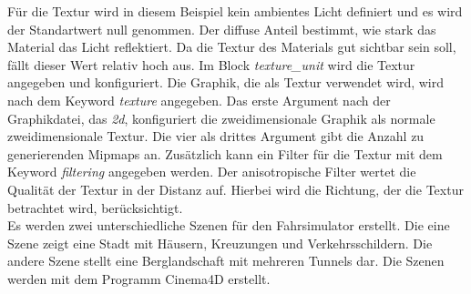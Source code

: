 Für die Textur wird in diesem Beispiel kein ambientes Licht definiert und es wird der Standartwert null genommen. Der diffuse Anteil bestimmt, wie stark das Material das Licht reflektiert. Da die Textur des Materials gut sichtbar sein soll, fällt dieser Wert relativ hoch aus. Im Block \textit{texture\_unit} wird die Textur angegeben und konfiguriert. Die Graphik, die als Textur verwendet wird, wird nach dem Keyword \textit{texture} angegeben. Das erste Argument nach der Graphikdatei, das \textit{2d}, konfiguriert die zweidimensionale Graphik als normale zweidimensionale Textur. Die vier als drittes Argument gibt die Anzahl zu generierenden Mipmaps an. Zusätzlich kann ein Filter für die Textur mit dem Keyword \textit{filtering} angegeben werden. Der anisotropische Filter wertet die Qualität der Textur in der Distanz auf. Hierbei wird die Richtung, der die Textur betrachtet wird, berücksichtigt.\\
Es werden zwei unterschiedliche Szenen für den Fahrsimulator erstellt. Die eine Szene zeigt eine Stadt mit Häusern, Kreuzungen und Verkehrsschildern. Die andere Szene stellt eine Berglandschaft mit mehreren Tunnels dar. Die Szenen werden mit dem Programm Cinema4D erstellt. 
